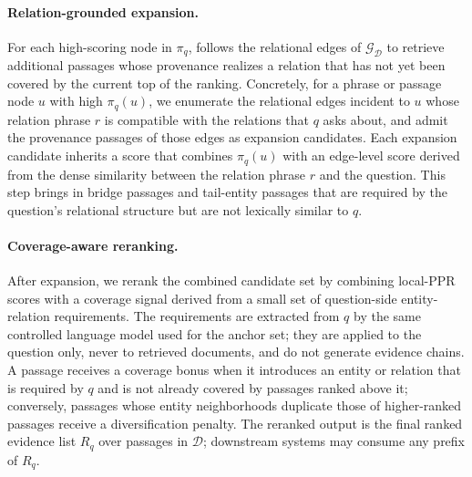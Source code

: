 \paragraph{Relation-grounded expansion.}
For each high-scoring node in $\pi_q$, \methodname{} follows the relational
edges of $\mathcal{G}_{\mathcal{D}}$ to retrieve additional passages whose
provenance realizes a relation that has not yet been covered by the
current top of the ranking. Concretely, for a phrase or passage node $u$
with high $\pi_q(u)$, we enumerate the relational edges incident to $u$
whose relation phrase $r$ is compatible with the relations that $q$ asks
about, and admit the provenance passages of those edges as expansion
candidates. Each expansion candidate inherits a score that combines
$\pi_q(u)$ with an edge-level score derived from the dense similarity
between the relation phrase $r$ and the question. This step brings in
bridge passages and tail-entity passages that are required by the
question's relational structure but are not lexically similar to $q$.

\paragraph{Coverage-aware reranking.}
After expansion, we rerank the combined candidate set by combining
local-PPR scores with a coverage signal derived from a small set of
question-side entity-relation requirements. The requirements are
extracted from $q$ by the same controlled language model used for the
anchor set; they are applied to the question only, never to retrieved
documents, and do not generate evidence chains. A passage receives a
coverage bonus when it introduces an entity or relation that is required
by $q$ and is not already covered by passages ranked above it;
conversely, passages whose entity neighborhoods duplicate those of
higher-ranked passages receive a diversification penalty. The reranked
output is the final ranked evidence list $R_q$ over passages in
$\mathcal{D}$; downstream systems may consume any prefix of $R_q$.
